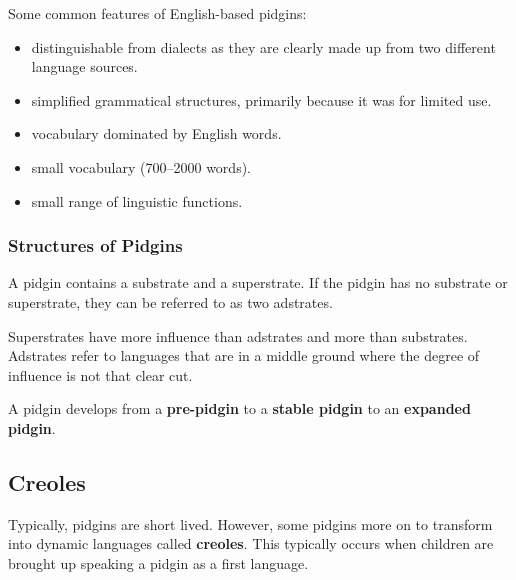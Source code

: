 \documentclass[../main.tex]{subfiles}
\begin{document}
    Some common features of English-based pidgins:
    \begin{itemize}
        \item distinguishable from dialects as they are clearly made up from two different language sources.
        \item simplified grammatical structures, primarily because it was for limited use.
        \item vocabulary dominated by English words.
        \item small vocabulary (700--2000 words).
        \item small range of linguistic functions.
    \end{itemize}

    \subsubsection{Structures of Pidgins}
    A pidgin contains a substrate and a superstrate. If the pidgin has no substrate or superstrate, they can be referred to as two adstrates. \par
    Superstrates have more influence than adstrates and more than substrates. Adstrates refer to languages that are in a middle ground where the degree of influence is not that clear cut. \par
    A pidgin develops from a \textbf{pre-pidgin} to a \textbf{stable pidgin} to an \textbf{expanded pidgin}.

    \subsection{Creoles}
    Typically, pidgins are short lived. However, some pidgins more on to transform into dynamic languages called \textbf{creoles}. This typically occurs when children are brought up speaking a pidgin as a first language.

\end{document}
